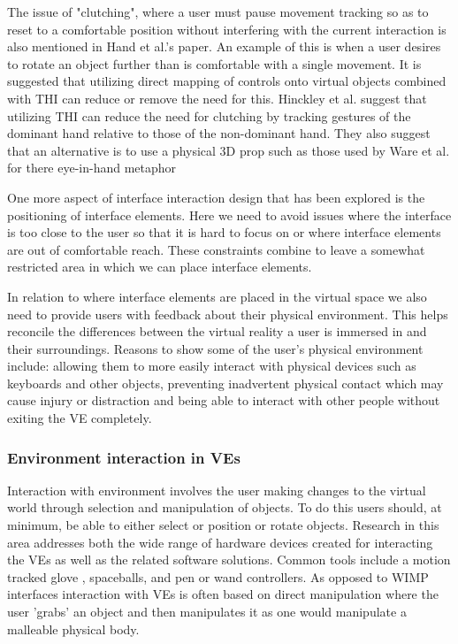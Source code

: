 \documentclass{sig-alternate-05-2015}
\begin{document}
 The issue of "clutching", where a user must pause movement tracking so as to reset to a comfortable position without interfering with the current interaction is also mentioned in Hand et al.'s paper.\cite{Hand1997} An example of this is when a user desires to rotate an object further than is comfortable with a single movement. It is suggested that utilizing direct mapping of controls onto virtual objects combined with THI can reduce or remove the need for this.\cite{Hand1997}  Hinckley et al. suggest that utilizing THI can reduce the need for clutching by tracking gestures of the dominant hand relative to those of the non-dominant hand.\cite{Hinckley1994} They also suggest that an alternative is to use a physical 3D prop such as those used by Ware et al. for there eye-in-hand metaphor\cite{Ware1990}
 
 One more aspect of interface interaction design that has been explored is the positioning of interface elements.\cite{alger2015visual} Here we need to avoid issues where the interface is too close to the user so that it is hard to focus on or where interface elements are out of comfortable reach. These constraints combine to leave a somewhat restricted area in which we can place interface elements.
 
In relation to where interface elements are placed in the virtual space we also need to provide users with feedback about their physical environment. This helps reconcile the differences between the virtual reality a user is immersed in and their surroundings\cite{Duval2014}. Reasons to show some of the user's physical environment include: allowing them to more easily interact with physical devices such as keyboards and other objects, preventing inadvertent physical contact which may cause injury or distraction and being able to interact with other people without exiting the VE completely.
 
 
 
\subsubsection{Environment interaction in VEs}
 Interaction with environment involves the user making changes to the virtual world through selection and manipulation of objects. To do this users should, at minimum, be able to either select or position or rotate objects\cite{Bowman2001}. Research in this area addresses both the wide range of hardware devices created for interacting the VEs as well as the related software solutions. Common tools include a motion tracked glove \cite{Zimmerman1986}, spaceballs\cite{Hand1997}, and pen or wand controllers\cite{Schultheis2012}. As opposed to WIMP interfaces interaction with VEs is often based on direct manipulation where the user 'grabs' an object and then manipulates it as one would manipulate a malleable physical body.
  
\end{document}
